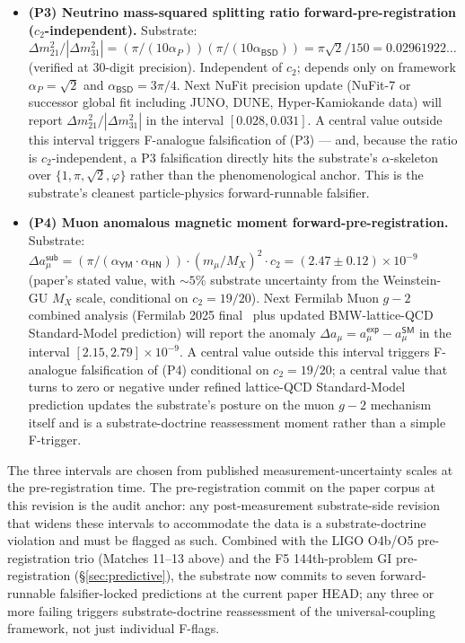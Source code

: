 \documentclass[11pt,a4paper]{amsart}
\theoremstyle{plain}
\theoremstyle{definition}
\begin{document}
\begin{description}[font=\normalfont\bfseries,leftmargin=2em,itemsep=6pt]
\begin{itemize}[itemsep=1pt,leftmargin=2em]
\item \textbf{(P3) Neutrino mass-squared splitting ratio forward-pre-registration ($c_2$-independent).} Substrate: $\Delta m^2_{21}/|\Delta m^2_{31}| = (\pi/(10\alpha_P))(\pi/(10\alpha_{\textsf{BSD}})) = \pi\sqrt{2}/150 = 0.02961922\ldots$ (verified at 30-digit precision). Independent of $c_2$; depends only on framework $\alpha_P = \sqrt{2}$ and $\alpha_{\textsf{BSD}} = 3\pi/4$. Next NuFit precision update (NuFit-7 or successor global fit including JUNO, DUNE, Hyper-Kamiokande data) will report $\Delta m^2_{21}/|\Delta m^2_{31}|$ in the interval $[0.028, 0.031]$. A central value outside this interval triggers F-analogue falsification of (P3) --- and, because the ratio is $c_2$-independent, a P3 falsification directly hits the substrate's $\alpha$-skeleton over $\{1, \pi, \sqrt{2}, \varphi\}$ rather than the phenomenological anchor. This is the substrate's cleanest particle-physics forward-runnable falsifier.

\item \textbf{(P4) Muon anomalous magnetic moment forward-pre-registration.} Substrate: $\Delta a_\mu^{\textsf{sub}} = (\pi/(\alpha_{\textsf{YM}}\cdot\alpha_{\textsf{HN}}))\cdot(m_\mu/M_X)^2\cdot c_2 = (2.47 \pm 0.12) \times 10^{-9}$ (paper's stated value, with $\sim 5\%$ substrate uncertainty from the Weinstein-GU $M_X$ scale, conditional on $c_2 = 19/20$). Next Fermilab Muon $g\!-\!2$ combined analysis (Fermilab 2025 final~\cite{fermilab-g2-2025} plus updated BMW-lattice-QCD Standard-Model prediction) will report the anomaly $\Delta a_\mu = a_\mu^{\textsf{exp}} - a_\mu^{\textsf{SM}}$ in the interval $[2.15, 2.79] \times 10^{-9}$. A central value outside this interval triggers F-analogue falsification of (P4) conditional on $c_2 = 19/20$; a central value that turns to zero or negative under refined lattice-QCD Standard-Model prediction updates the substrate's posture on the muon $g-2$ mechanism itself and is a substrate-doctrine reassessment moment rather than a simple F-trigger.

\end{itemize}

\noindent The three intervals are chosen from published measurement-uncertainty scales at the pre-registration time. The pre-registration commit on the paper corpus at this revision is the audit anchor: any post-measurement substrate-side revision that widens these intervals to accommodate the data is a substrate-doctrine violation and must be flagged as such. Combined with the LIGO O4b/O5 pre-registration trio (Matches 11--13 above) and the F5 144th-problem GI pre-registration (\S\ref{sec:predictive}), the substrate now commits to seven forward-runnable falsifier-locked predictions at the current paper HEAD; any three or more failing triggers substrate-doctrine reassessment of the universal-coupling framework, not just individual F-flags.

\end{description}
\end{document}
